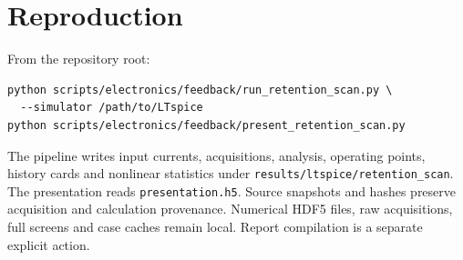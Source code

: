 \documentclass[10pt,a4paper]{article}
\begin{document}
\section{Reproduction}
From the repository root:
\begin{verbatim}
python scripts/electronics/feedback/run_retention_scan.py \
  --simulator /path/to/LTspice
python scripts/electronics/feedback/present_retention_scan.py
\end{verbatim}
The pipeline writes input currents, acquisitions, analysis, operating points,
history cards and nonlinear statistics under \texttt{results/ltspice/retention\_scan}.
The presentation reads \texttt{presentation.h5}. Source snapshots and hashes
preserve acquisition and calculation provenance. Numerical HDF5 files, raw acquisitions, full screens
and case caches remain local. Report compilation is a separate explicit action.
\end{document}
